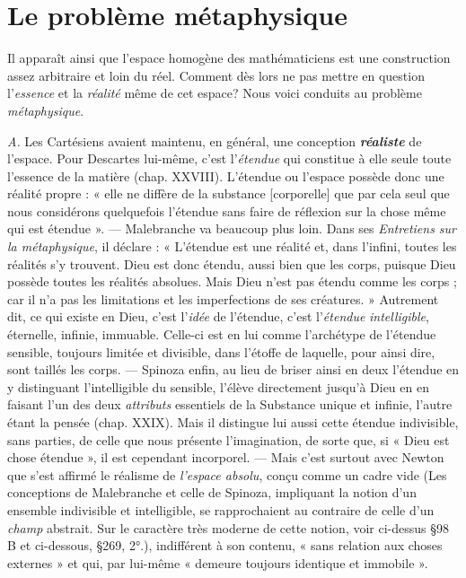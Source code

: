 \section{Le problème métaphysique}%
Il apparaît ainsi que l’espace
homogène des mathématiciens est une construction assez arbitraire
et loin du réel. Comment dès lors ne pas mettre en question
l'{\it essence} et la {\it réalité} même de cet espace? Nous voici conduits au
problème {\it métaphysique}.

{\it A.} Les Cartésiens avaient maintenu, en général, une conception
\textbf{\textit {réaliste}} de l’espace. Pour Descartes lui-même, c’est l'{\it étendue} qui
constitue à elle seule toute l’essence de la matière (chap. XXVIII).
L’étendue ou l’espace possède donc une réalité propre : « elle ne diffère
de la substance [corporelle] que par cela seul que nous considérons
quelquefois l’étendue sans faire de réflexion sur la chose même
qui est étendue ». — Malebranche va beaucoup plus loin. Dans
ses {\it Entretiens sur la métaphysique}, il déclare : « L’étendue est une
réalité et, dans l’infini, toutes les réalités s’y trouvent. Dieu est donc
étendu, aussi bien que les corps, puisque Dieu possède toutes les réalités
absolues. Mais Dieu n’est pas étendu comme les corps ; car il
n’a pas les limitations et les imperfections de ses créatures. » Autrement
dit, ce qui existe en Dieu, c’est l’{\it idée} de l’étendue, c’est l'{\it étendue}
{\it intelligible}, éternelle, infinie, immuable. Celle-ci est en lui comme
l’archétype de l’étendue sensible, toujours limitée et divisible, dans
l’étoffe de laquelle, pour ainsi dire, sont taillés les corps. — Spinoza
enfin, au lieu de briser ainsi en deux l’étendue en y distinguant l’intelligible
du sensible, l’élève directement jusqu’à Dieu en en faisant
l’un des deux {\it attributs} essentiels de la Substance unique et infinie,
l’autre étant la pensée (chap. XXIX). Mais il distingue lui aussi cette
étendue indivisible, sans parties, de celle que nous présente l’imagination,
de sorte que, si « Dieu est chose étendue », il est cependant
incorporel. — Mais c’est surtout avec Newton que s’est affirmé le
réalisme de {\it l’espace absolu}, conçu comme un cadre vide {\scriptsize (Les
conceptions de Malebranche et celle de Spinoza, impliquant la notion d’un
ensemble indivisible et intelligible, se rapprochaient au contraire de celle
d’un {\it champ} abstrait. Sur le caractère très moderne de cette notion, voir
ci-dessus \S 98 B et ci-dessous, \S 269, 2°.)}, indifférent à
son contenu, « sans relation aux choses externes » et qui, par lui-même
« demeure toujours identique et immobile ».

